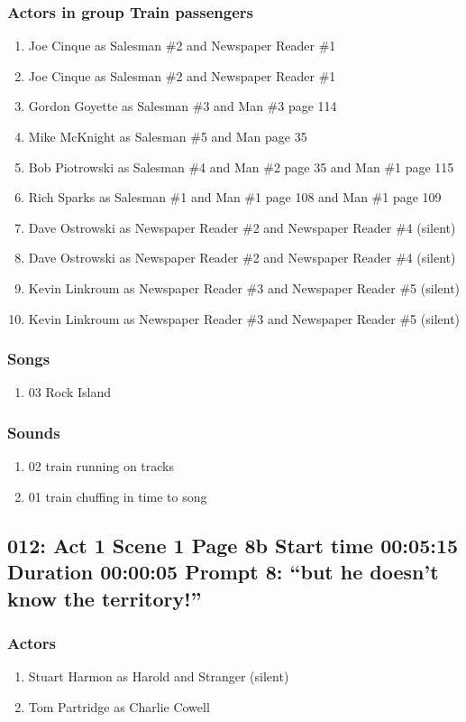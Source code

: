 \subsubsection{Actors in group Train passengers}
\begin{enumerate}
\item Joe Cinque as Salesman \#2 and Newspaper Reader \#1
\item Joe Cinque as Salesman \#2 and Newspaper Reader \#1
\item Gordon Goyette as Salesman \#3 and Man \#3 page 114
\item Mike McKnight as Salesman \#5 and Man page 35
\item Bob Piotrowski as Salesman \#4 and Man \#2 page 35 and Man \#1 page 115
\item Rich Sparks as Salesman \#1 and Man \#1 page 108 and Man \#1 page 109
\item Dave Ostrowski as Newspaper Reader \#2 and Newspaper Reader \#4 (silent)
\item Dave Ostrowski as Newspaper Reader \#2 and Newspaper Reader \#4 (silent)
\item Kevin Linkroum as Newspaper Reader \#3 and Newspaper Reader \#5 (silent)
\item Kevin Linkroum as Newspaper Reader \#3 and Newspaper Reader \#5 (silent)
\end{enumerate}

\subsubsection{Songs}
\begin{enumerate}
\item 03 Rock Island
\end{enumerate}\subsubsection{Sounds}
\begin{enumerate}
\item 02 train running on tracks
\item 01 train chuffing in time to song
\end{enumerate}
\subsection{012: Act 1 Scene 1 Page 8b Start time 00:05:15 Duration 00:00:05 Prompt 8: ``but he doesn't know the territory!''}

\subsubsection{Actors}
\begin{enumerate}
\item Stuart Harmon as Harold and Stranger (silent)
\item Tom Partridge as Charlie Cowell
\end{enumerate}
